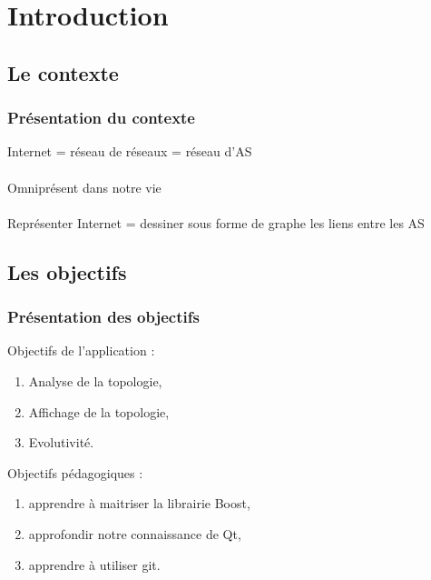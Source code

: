 \section*{Introduction}

\subsection*{Le contexte}
\frame
{
\frametitle{Pr\'esentation du contexte}
Internet = r\'eseau de r\'eseaux = r\'eseau d'AS\\
~\\
Omnipr\'esent dans notre vie\\
~\\
Repr\'esenter Internet = dessiner sous forme de graphe les liens entre les AS
}

\subsection*{Les objectifs}
\frame
{
\frametitle{Pr\'esentation des objectifs}
Objectifs de l'application :
\begin{enumerate}
 \item Analyse de la topologie,
 \item Affichage de la topologie,
 \item Evolutivit\'e.
\end{enumerate}

Objectifs p\'edagogiques :
\begin{enumerate}
 \item apprendre \`a maitriser la librairie Boost,
 \item approfondir notre connaissance de Qt,
 \item apprendre \`a utiliser git.
\end{enumerate}

}